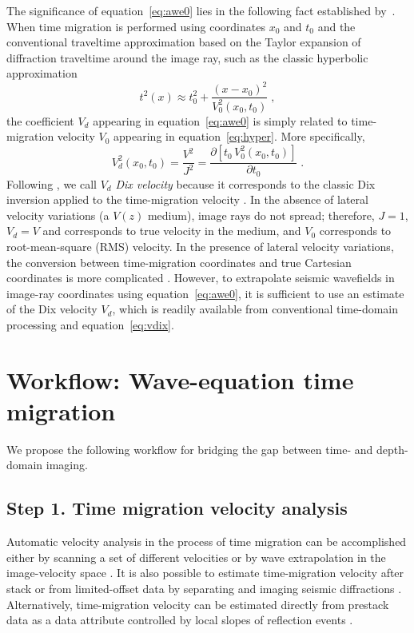 \documentclass[manuscript]{geophysics}
\begin{document}
The significance of equation~\ref{eq:awe0} lies in the following
fact established by~\cite{ip}. When time migration is performed using
coordinates $x_0$ and $t_0$ and the conventional traveltime approximation based
on the Taylor expansion of diffraction traveltime around the image
ray, such as the classic hyperbolic approximation
\begin{equation}
\label{eq:hyper}
t^2(x) \approx t_0^2+\frac{(x-x_0)^2}{V_0^2(x_0,t_0)}\;,
\end{equation}
the coefficient $V_d$ appearing in equation~\ref{eq:awe0} is simply
related to time-migration velocity $V_0$ appearing in
equation~\ref{eq:hyper}. More specifically,
\begin{equation}
\label{eq:vdix}
V_d^2(x_0,t_0) = \frac{V^2}{J^2} = \frac{\partial \left[t_0\,V_0^2(x_0,t_0)\right]}{\partial t_0}\;.
\end{equation}
Following \cite{geo}, we call $V_d$ \emph{Dix velocity} because it
corresponds to the classic Dix inversion applied to the time-migration
velocity \cite[]{GEO20-01-00680086}. In the absence of lateral
velocity variations (a $V(z)$ medium), image rays do not spread;
therefore, $J=1$, $V_d=V$ and corresponds to true velocity in the
medium, and $V_0$ corresponds to root-mean-square (RMS) velocity. In
the presence of lateral velocity variations, the conversion between
time-migration coordinates and true Cartesian coordinates is more
complicated \cite[]{GEO60-04-11181127,geo,siwei2}. However, to
extrapolate seismic wavefields in image-ray coordinates using
equation~\ref{eq:awe0}, it is sufficient to use an estimate of the Dix
velocity $V_d$, which is readily available from conventional
time-domain processing and equation~\ref{eq:vdix}.

\section{Workflow: Wave-equation time migration}

We propose the following workflow for bridging the gap between
time- and depth-domain imaging.

\subsection{Step 1. Time migration velocity analysis}

Automatic velocity analysis in the process of time migration
can be accomplished either by scanning a set of different velocities
\cite[]{GEO66-06-16991713} or by wave extrapolation in the
image-velocity space \cite[]{fomel2003time}. It is also possible
to estimate time-migration velocity after stack or from limited-offset
data by separating and imaging seismic
diffractions \cite[]{GEO49-11-18691880,diffr,burnett,dell2011common,coimbra2013migration,decker2017diffraction}. Alternatively,
time-migration velocity can be estimated directly from prestack data
as a data attribute controlled by local slopes of reflection
events \cite[]{pmig,cooke}. 
\end{document}

